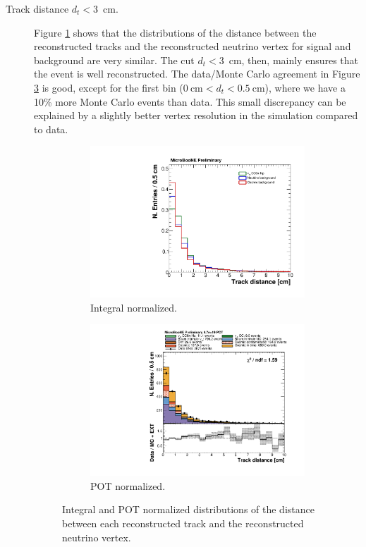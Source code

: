 \begin{description}
\item[Track distance $d_{t} < 3$~cm.] Figure \ref{fig:track_norm} shows that the distributions of the distance between the reconstructed tracks and the reconstructed neutrino vertex for signal and background are very similar. The cut $d_{t} < 3$~cm, then, mainly ensures that the event is well reconstructed. The data/Monte Carlo agreement in Figure \ref{fig:track_pot} is good, except for the first bin ($0~\mathrm{cm} < d_{t} < 0.5~\mathrm{cm}$), where we have a 10\% more Monte Carlo events than data. This small discrepancy can be explained by a slightly better vertex resolution in the simulation compared to data.

\begin{figure}[htbp]
\centering
  \begin{subfigure}{0.45\textwidth}
    \includegraphics[width=\linewidth]{figures/h_track_distance_norm.pdf}
    \caption{Integral normalized.} \label{fig:track_norm}
  \end{subfigure}
    \begin{subfigure}{0.45\textwidth}
    \includegraphics[width=\linewidth]{figures/h_track_distance.pdf}
    \caption{POT normalized.} \label{fig:track_pot}
  \end{subfigure}
  \caption{Integral and POT normalized distributions of the distance between each reconstructed track and the reconstructed neutrino vertex.}
\end{figure}


\end{description}
